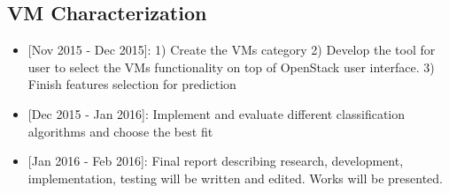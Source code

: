 \subsection{VM Characterization}

\begin{itemize}
\item{[Nov 2015 - Dec 2015]:} 1) Create the VMs category 2) Develop the tool for user to select the VMs functionality on top of OpenStack user interface. 3) Finish features selection for prediction
\item{[Dec 2015 - Jan 2016]:} Implement and evaluate different classification algorithms and choose the best fit
\item{[Jan 2016 - Feb 2016]:} Final report describing research, development, implementation, testing will be written and edited. Works will be presented.
\end{itemize}
